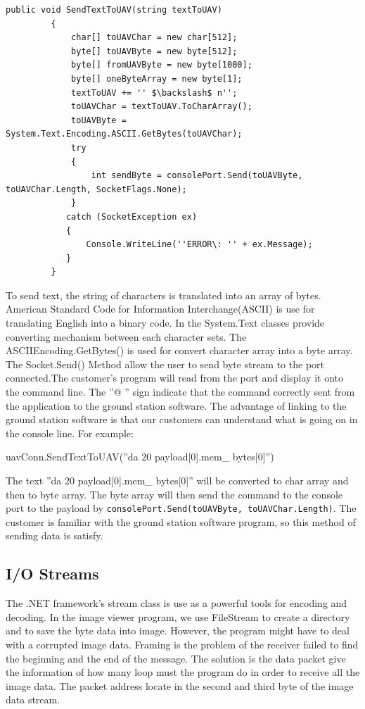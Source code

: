 	

\begin{lstlisting}[caption={send text in byte array},label=lst:sendT]
	 public void SendTextToUAV(string textToUAV)	        
         {        
             char[] toUAVChar = new char[512];       
             byte[] toUAVByte = new byte[512];        
             byte[] fromUAVByte = new byte[1000];       
             byte[] oneByteArray = new byte[1];       
             textToUAV += '' $\backslash$ n'';        
             toUAVChar = textToUAV.ToCharArray();        
             toUAVByte = System.Text.Encoding.ASCII.GetBytes(toUAVChar);       
             try       
             {      
                 int sendByte = consolePort.Send(toUAVByte, toUAVChar.Length, SocketFlags.None);     
             }     
            catch (SocketException ex)      
            {       
                Console.WriteLine(''ERROR\: '' + ex.Message);       
            }       
         }
\end{lstlisting}
                

To send text, the string of characters is translated into an array of bytes. American Standard Code for Information Interchange(ASCII) is use for translating English into a binary code. In the System.Text classes provide converting mechanism between each character sets. The ASCIIEncoding.GetBytes() is used for convert character array into a byte array.  
The Socket.Send() Method allow the user to send byte stream to the port connected.The customer's program will read from the port and display it onto the command line. The ''@ '' sign indicate that the command correctly sent from the application to the ground station software. The advantage of linking to the ground station software is that our customers can understand what is going on in the console line. For example:

\begin{center}
uavConn.SendTextToUAV(''da 20 payload[0].mem\_ bytes[0]'')\;
\end{center}

The text ''da 20 payload[0].mem\_ bytes[0]'' will be converted to char array and then to byte array. The byte array will then send the command to the console port to the payload by \texttt{consolePort.Send(toUAVByte, toUAVChar.Length)}. The customer is familiar with the ground station software program, so this method of sending data is satisfy. 

\subsection{I/O Streams}
    The .NET framework's stream class is use as a powerful tools for encoding and decoding\cite{davidB}. In the image viewer program, we use FileStream to create a directory and to save the byte data into image. However, the program might have to deal with a corrupted image data. Framing is the problem of the receiver failed to find the beginning and the end of the message. The solution is the data packet give the information of how many loop must the program do in order to receive all the image data. The packet address locate in the second and third byte of the image data stream. 
     

